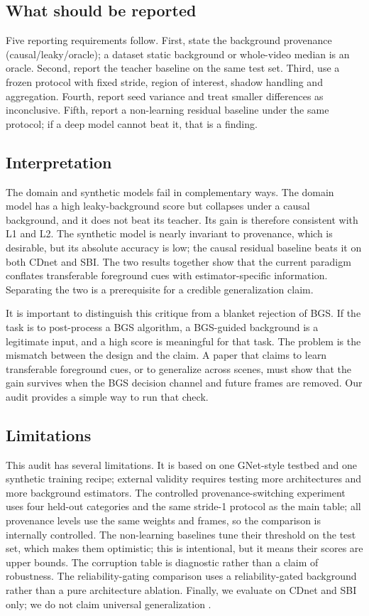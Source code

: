 \documentclass[sn-mathphys-num,iicol]{sn-jnl}
\begin{document}
\subsection{What should be reported}

Five reporting requirements follow. First, state the background provenance
(causal/leaky/oracle); a dataset static background or whole-video median is an
oracle. Second, report the teacher baseline on the same test set. Third, use a
frozen protocol with fixed stride, region of interest, shadow handling and
aggregation. Fourth, report seed variance and treat smaller differences as
inconclusive. Fifth, report a non-learning residual baseline under the same
protocol; if a deep model cannot beat it, that is a finding.

\subsection{Interpretation}

The domain and synthetic models fail in complementary ways. The domain model has
a high leaky-background score but collapses under a causal background, and it
does not beat its teacher. Its gain is therefore consistent with L1 and L2. The
synthetic model is nearly invariant to provenance, which is desirable, but its
absolute accuracy is low; the causal residual baseline beats it on both CDnet and
SBI. The two results together show that the current paradigm conflates
transferable foreground cues with estimator-specific information. Separating the
two is a prerequisite for a credible generalization claim.

It is important to distinguish this critique from a blanket rejection of BGS. If
the task is to post-process a BGS algorithm, a BGS-guided background is a
legitimate input, and a high score is meaningful for that task. The problem is
the mismatch between the design and the claim. A paper that claims to learn
transferable foreground cues, or to generalize across scenes, must show that the
gain survives when the BGS decision channel and future frames are removed. Our
audit provides a simple way to run that check.

\subsection{Limitations}

This audit has several limitations. It is based on one GNet-style testbed and one
synthetic training recipe; external validity requires testing more architectures
and more background estimators. The controlled provenance-switching experiment
uses four held-out categories and the same stride-1 protocol as the main table;
all provenance levels use the same weights and frames, so the comparison is
internally controlled. The non-learning baselines
tune their threshold on the test set, which makes them optimistic; this is
intentional, but it means their scores are upper bounds. The corruption table
is diagnostic rather than a claim of robustness. The
reliability-gating comparison uses a reliability-gated background rather than a
pure architecture ablation. Finally, we evaluate on CDnet and SBI only; we do not claim universal generalization
\cite{dgsurvey2022}.
\end{document}

